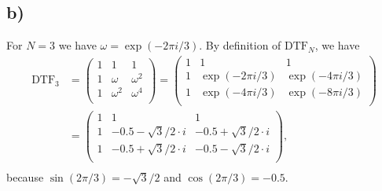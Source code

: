 \documentclass[12pt]{article}
\begin{document}
\subsection*{b)}
For $N = 3$ we have $\omega = \exp(-2\pi i/3)$. By definition of $\text{DTF}_{N}$, we have
\begin{align*}
\text{DTF}_{3} &= \left( \begin{array}{rrr}1 & 1 & 1 \\1 & \omega & \omega^{2} \\1 & \omega^{2} & \omega^{4}\\\end{array}\right) =
\left( \begin{array}{rrr}1 & 1 & 1 \\1 & \exp(-2\pi i/3) & \exp(-4\pi i/3) \\1 & \exp(-4\pi i/3) & \exp(-8\pi i/3)\\\end{array}\right)\\
&= \left( \begin{array}{rrr}1 & 1 & 1 \\1 & -0.5-\sqrt{3}/2\cdot i & -0.5+\sqrt{3}/2\cdot i \\1 & -0.5+\sqrt{3}/2\cdot i & -0.5-\sqrt{3}/2\cdot i\\\end{array}\right),\\
\end{align*}
because $\sin(2\pi/3) = -\sqrt{3}/2$ and $\cos(2\pi/3) = -0.5$.
\end{document}
